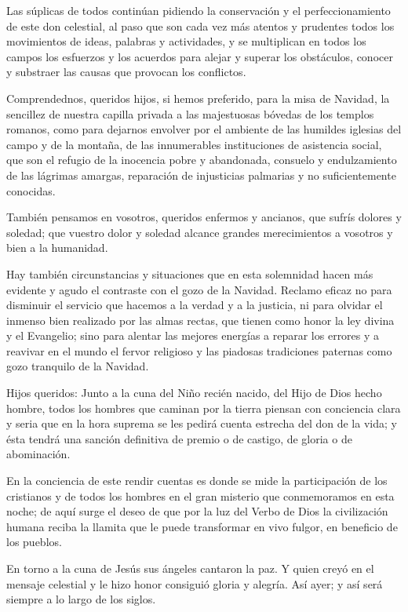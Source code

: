 \begin{body}
\begin{body}
Las súplicas de todos continúan pidiendo la conservación y el perfeccionamiento de este don celestial, al paso que son cada vez más atentos y prudentes todos los movimientos de ideas, palabras y actividades, y se multiplican en todos los campos los esfuerzos y los acuerdos para alejar y superar los obstáculos, conocer y substraer las causas que provocan los conflictos.

Comprendednos, queridos hijos, si hemos preferido, para la misa de Navidad, la sencillez de nuestra capilla privada a las majestuosas bóvedas de los templos romanos, como para dejarnos envolver por el ambiente de las humildes iglesias del campo y de la montaña, de las innumerables instituciones de asistencia social, que son el refugio de la inocencia pobre y abandonada, consuelo y endulzamiento de las lágrimas amargas, reparación de injusticias palmarias y no suficientemente conocidas.

También pensamos en vosotros, queridos enfermos y ancianos, que sufrís dolores y soledad; que vuestro dolor y soledad alcance grandes merecimientos a vosotros y bien a la humanidad.

Hay también circunstancias y situaciones que en esta solemnidad hacen más evidente y agudo el contraste con el gozo de la Navidad. Reclamo eficaz no para disminuir el servicio que hacemos a la verdad y a la justicia, ni para olvidar el inmenso bien realizado por las almas rectas, que tienen como honor la ley divina y el Evangelio; sino para alentar las mejores energías a reparar los errores y a reavivar en el mundo el fervor religioso y las piadosas tradiciones paternas como gozo tranquilo de la Navidad.

Hijos queridos: Junto a la cuna del Niño recién nacido, del Hijo de Dios hecho hombre, todos los hombres que caminan por la tierra piensan con conciencia clara y seria que en la hora suprema se les pedirá cuenta estrecha del don de la vida; y ésta tendrá una sanción definitiva de premio o de castigo, de gloria o de abominación.

En la conciencia de este rendir cuentas es donde se mide la participación de los cristianos y de todos los hombres en el gran misterio que conmemoramos en esta noche; de aquí surge el deseo de que por la luz del Verbo de Dios la civilización humana reciba la llamita que le puede transformar en vivo fulgor, en beneficio de los pueblos.

En torno a la cuna de Jesús sus ángeles cantaron la paz. Y quien creyó en el mensaje celestial y le hizo honor consiguió gloria y alegría. Así ayer; y así será siempre a lo largo de los siglos.


\end{body}
\end{body}
